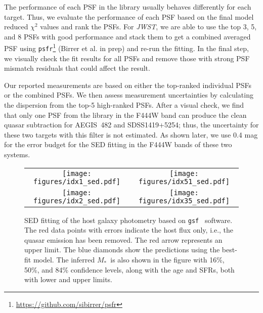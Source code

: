 \documentclass[twocolumn]{aastex631}
\newcommand{\smass}{{$M_*$}}
\newcommand{\jwst}{{\it JWST}}
\begin{document}
The performance of each PSF in the library usually behaves differently for each target. Thus, we evaluate the performance of each PSF based on the final model reduced $\chi^2$ values and rank the PSFs. For \jwst, we are able to use the top 3, 5, and 8 PSFs with good performance and stack them to get a combined averaged PSF using \texttt{psfr}\footnote{\url{https://github.com/sibirrer/psfr}\label{note1}} (Birrer et al. in prep) and re-run the fitting. In the final step, we visually check the fit results for all PSFs and remove those with strong PSF mismatch residuals that could affect the result. 

Our reported measurements are based on either the top-ranked individual PSFs or the combined PSFs. We then assess measurement uncertainties by calculating the dispersion from the top-5 high-ranked PSFs. After a visual check, we find that only one PSF from the library in the F444W band can produce the clean quasar subtraction for AEGIS~482 and SDSS1419+5254; thus, the uncertainty for these two targets with this filter is not estimated. As shown later, we use 0.4 mag for the error budget for the SED fitting in the F444W bands of these two systems.


\begin{figure*}
\centering
\begin{tabular}{c c}
\hspace*{-1cm}  
{\texttt{[image: figures/idx1\_sed.pdf]}}&
{\texttt{[image: figures/idx51\_sed.pdf]}}\\
\hspace*{-1cm}  
{\texttt{[image: figures/idx2\_sed.pdf]}}&
{\texttt{[image: figures/idx35\_sed.pdf]}}\\
\end{tabular}
\caption{SED fitting of the host galaxy photometry based on \texttt{gsf}~\citep{Morishita2019} software. The red data points with errors indicate the host flux only, i.e., the quasar emission has been removed. The red arrow represents an upper limit. The blue diamonds show the predictions using the best-fit model. The inferred \smass\ is also shown in the figure with 16\%, 50\%, and 84\% confidence levels, along with the age and SFRs, both with lower and upper limits.
\label{fig:sed_spec}}
\end{figure*}
\end{document}
